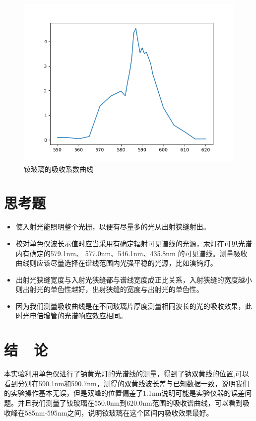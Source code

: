 \documentclass{buaaemp}
\begin{document}
\begin{figure}
    \centering
\includegraphics[width=\linewidth]{image/absorptioncoeff.png}
    \caption{钕玻璃的吸收系数曲线}
    \label{fig:my_label4}
\end{figure}

\section{思考题}
\begin{itemize}
    \item 使入射光能照明整个光栅，以便有尽量多的光从出射狭缝射出。
    \item 校对单色仪波长示值时应当采用有确定辐射可见谱线的光源，汞灯在可见光谱内有确定的579.1nm、 577.0nm、546.1nm、435.8nm 的可见谱线。测量吸收曲线则应该尽量选择在谱线范围内光强平稳的光源，比如溴钨灯。
    \item 出射光狭缝宽度与入射光狭缝都与谱线宽度成正比关系，入射狭缝的宽度越小则出射光的单色性越好，出射狭缝的宽度与出射光的单色性。
    \item 因为我们测量吸收曲线是在不同玻璃片厚度测量相同波长的光的吸收效果，此时光电倍增管的光谱响应效应相同。
\end{itemize}
\section{结~~论}
本实验利用单色仪进行了钠黄光灯的光谱线的测量，得到了钠双黄线的位置,可以看到分别在590.1nm和590.7nm，测得的双黄线波长差与已知数据一致，说明我们的实验操作基本无误，但是双峰的位置偏差了1.1nm说明可能是实验仪器的误差问题。并且我们测量了钕玻璃在550.0nm到620.0nm范围的吸收谱曲线，可以看到吸收峰在585nm-595nm之间，说明钕玻璃在这个区间内吸收效果最好。
\end{document}
